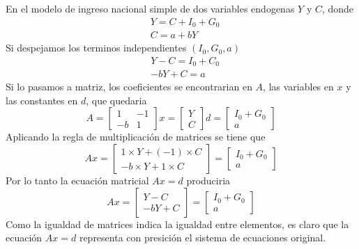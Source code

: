 \begin{ejemplo}
    En el modelo de ingreso nacional simple de dos variables endogenas \(Y\) y \(C\), donde 
    $$
    \begin{aligned}
        & Y = C + I_0 + G_0 \\
        & C = a + bY
    \end{aligned}
    $$
    Si despejamos los terminos independientes \((I_0, G_0, a)\)
    $$
    \begin{aligned}
        & Y - C = I_0 + C_0 \\ 
        & -bY + C = a
    \end{aligned}
    $$
    Si lo pasamos a matriz, los coeficientes se encontrarian en \(A\), las variables en \(x\) y las constantes en \(d\), que quedaria 
    \[
    A = \begin{bmatrix}
        1 & -1 \\
        -b & 1 
    \end{bmatrix}
    x = \begin{bmatrix}
        Y \\
        C
    \end{bmatrix}
    d = \begin{bmatrix}
        I_0+G_0 \\
        a
    \end{bmatrix}
    \]
    Aplicando la regla de multiplicación de matrices se tiene que 
    \[
    Ax = \begin{bmatrix}
        1 \times Y + (-1) \times C \\ 
        -b \times Y + 1 \times C
    \end{bmatrix} 
    = 
    \begin{bmatrix}
        I_0+G_0 \\
        a
    \end{bmatrix}
    \]
    Por lo tanto la ecuación matricial \(Ax = d\) produciria 
    \[
    Ax = \begin{bmatrix}
        Y - C \\ 
        -bY + C
    \end{bmatrix} 
    = 
    \begin{bmatrix}
        I_0+G_0 \\
        a
    \end{bmatrix}
    \]
    Como la igualdad de matrices indica la igualdad entre elementos, es claro que la ecuación \(Ax = d\) representa con presición el sistema de ecuaciones original. 
\end{ejemplo}





